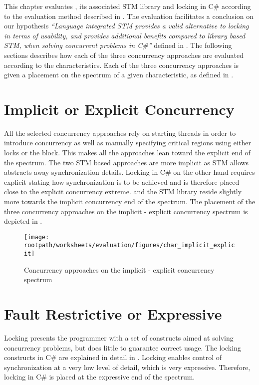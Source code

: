 \makeatletter {}\makeatother
{}
This chapter evaluates \stmname, its associated \ac{STM} library and locking in C\# according to the evaluation method described in . The evaluation facilitates a conclusion on our hypothesis \textit{``Language integrated \ac{STM} provides a valid alternative to locking in terms of usability, and provides additional benefits compared to library based \ac{STM}, when solving concurrent problems in C\#''} defined in .
\label{chap:evaluation}
The following sections describes how each of the three concurrency approaches are evaluated according to the characteristics. Each of the three concurrency approaches is given a placement on the spectrum of a given characteristic, as defined in .

\section{Implicit or Explicit Concurrency}
All the selected concurrency approaches rely on starting threads in order to introduce concurrency as well as manually specifying critical regions using either locks or the  block. This makes all the approaches lean toward the explicit end of the spectrum. The two \ac{STM} based approaches are more implicit as \ac{STM} allows abstracts away synchronization details. Locking in C\# on the other hand requires explicit stating how synchronization is to be achieved and is therefore placed close to the explicit concurrency extreme. \stmnamesp and the \ac{STM} library reside slightly more towards the implicit concurrency end of the spectrum. The placement of the three concurrency approaches on the implicit - explicit concurrency spectrum is depicted in .

\begin{figure}[htbp]
\centering
 \texttt{[image: \\rootpath/worksheets/evaluation/figures/char\_implicit\_explicit]} 
 \caption{Concurrency approaches on the implicit - explicit concurrency spectrum}
\label{fig:char_implicit_explicit}
\end{figure}

\section{Fault Restrictive or Expressive}
Locking presents the programmer with a set of constructs aimed at solving concurrency problems, but does little to guarantee correct usage. The locking constructs in C\# are explained in detail in . Locking enables control of synchronization at a very low level of detail, which is very expressive. Therefore, locking in C\# is placed at the expressive end of the spectrum.

